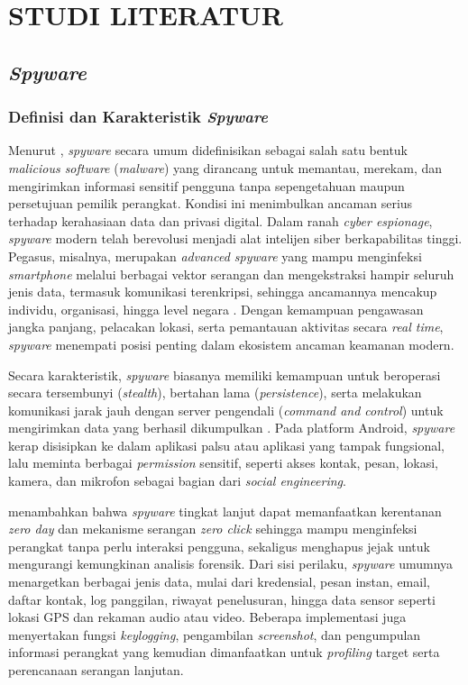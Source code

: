 \chapter{STUDI LITERATUR}
\label{chap:studi-literatur}

\section{\textit{Spyware}}
\subsection{Definisi dan Karakteristik \textit{Spyware}}

Menurut \textcite{reddy2024review}, \textit{spyware} secara umum 
didefinisikan sebagai salah satu bentuk \textit{malicious software} 
(\textit{malware}) yang dirancang untuk memantau, merekam, dan 
mengirimkan informasi sensitif pengguna tanpa sepengetahuan maupun 
persetujuan pemilik perangkat. Kondisi ini menimbulkan ancaman serius 
terhadap kerahasiaan data dan privasi digital. Dalam ranah 
\textit{cyber espionage}, \textit{spyware} modern telah berevolusi 
menjadi alat intelijen siber berkapabilitas tinggi. Pegasus, 
misalnya, merupakan \textit{advanced spyware} yang mampu menginfeksi 
\textit{smartphone} melalui berbagai vektor serangan dan mengekstraksi 
hampir seluruh jenis data, termasuk komunikasi terenkripsi, sehingga 
ancamannya mencakup individu, organisasi, hingga level negara 
\autocite{kareem2024pegasus}. Dengan kemampuan pengawasan jangka 
panjang, pelacakan lokasi, serta pemantauan aktivitas secara 
\textit{real time}, \textit{spyware} menempati posisi penting 
dalam ekosistem ancaman keamanan modern.

Secara karakteristik, \textit{spyware} biasanya memiliki kemampuan 
untuk beroperasi secara tersembunyi (\textit{stealth}), bertahan 
lama (\textit{persistence}), serta melakukan komunikasi jarak jauh 
dengan server pengendali (\textit{command and control}) untuk mengirimkan 
data yang berhasil dikumpulkan \autocite{salih2020spyware}. Pada platform 
Android, \textit{spyware} kerap disisipkan ke dalam aplikasi palsu atau 
aplikasi yang tampak fungsional, lalu meminta berbagai \textit{permission} 
sensitif, seperti akses kontak, pesan, lokasi, kamera, dan mikrofon 
sebagai bagian dari \textit{social engineering}.

\textcite{kareem2024pegasus} menambahkan bahwa \textit{spyware} tingkat lanjut dapat 
memanfaatkan kerentanan \textit{zero day} dan mekanisme serangan 
\textit{zero click} sehingga mampu menginfeksi perangkat tanpa perlu 
interaksi pengguna, sekaligus menghapus jejak untuk mengurangi kemungkinan 
analisis forensik. Dari sisi perilaku, \textit{spyware} umumnya menargetkan 
berbagai jenis data, mulai dari kredensial, pesan instan, email, daftar 
kontak, log panggilan, riwayat penelusuran, hingga data sensor seperti 
lokasi GPS dan rekaman audio atau video. Beberapa implementasi juga 
menyertakan fungsi \textit{keylogging}, pengambilan \textit{screenshot}, 
dan pengumpulan informasi perangkat yang kemudian dimanfaatkan untuk 
\textit{profiling} target serta perencanaan serangan lanjutan.

